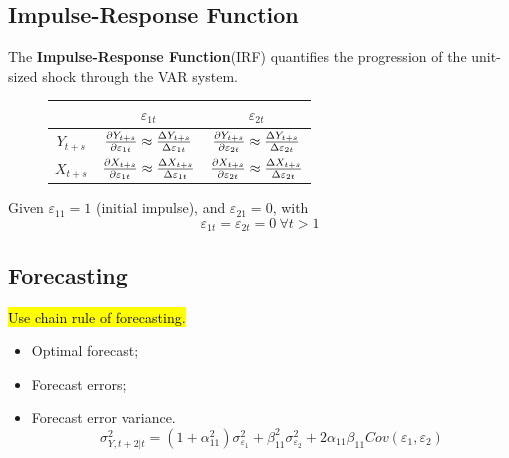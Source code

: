 \documentclass[11pt]{article}
\begin{document}
        \subsection{Impulse-Response Function}
            \begin{definition}
                The \textbf{Impulse-Response Function}(IRF) quantifies the progression of the unit-sized shock through the VAR system.
                \begin{figure}[H]
                    \centering
                    \begin{tabular}{c|c|c}
                         & $\varepsilon_{1t}$ & $\varepsilon_{2t}$ \\
                         \hline
                         $Y_{t+s}$ 
                         & $\frac{\partial{Y_{t+s}}}{\partial{\varepsilon_{1t}}} \approx \frac{\Delta Y_{t+s}}{\Delta \varepsilon_{1t}}$ 
                         & $\frac{\partial{Y_{t+s}}}{\partial{\varepsilon_{2t}}} \approx \frac{\Delta Y_{t+s}}{\Delta \varepsilon_{2t}}$\\
                         $X_{t+s}$ 
                         & $\frac{\partial{X_{t+s}}}{\partial{\varepsilon_{1t}}} \approx \frac{\Delta X_{t+s}}{\Delta \varepsilon_{1t}}$ 
                         & $\frac{\partial{X_{t+s}}}{\partial{\varepsilon_{2t}}} \approx \frac{\Delta X_{t+s}}{\Delta \varepsilon_{2t}}$
                    \end{tabular}
                \end{figure}
            \end{definition}
            
            \begin{remark}
                Given $\varepsilon_{11} = 1$ (initial impulse), and $\varepsilon_{21} = 0$, with 
                \begin{equation}
                    \varepsilon_{1t} = \varepsilon_{2t} = 0\ \forall t > 1
                \end{equation}
            \end{remark}
        \subsection{Forecasting}
        	\par \hl{Use chain rule of forecasting.}
            \begin{itemize}
                \item Optimal forecast;
                \item Forecast errors;
                \item Forecast error variance.
                \begin{equation}
                    \sigma_{Y, t+2|t}^2 = (1 + \alpha_{11}^2) \sigma_{\varepsilon_1}^2 + \beta_{11}^2  \sigma_{\varepsilon_2}^2 + 2 \alpha_{11} \beta_{11} Cov(\varepsilon_1, \varepsilon_2)
                \end{equation}
            \end{itemize}
            
\end{document}
